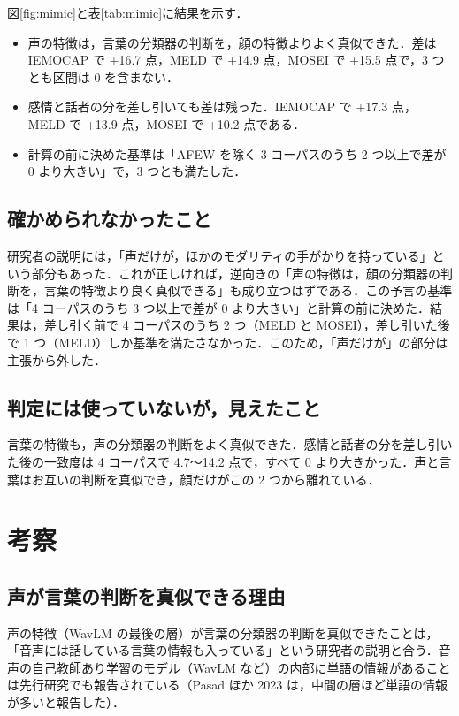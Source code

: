 \documentclass[a4paper,11pt]{ltjsarticle}
\begin{document}
図\ref{fig:mimic}と表\ref{tab:mimic}に結果を示す．
\begin{itemize}
  \item 声の特徴は，言葉の分類器の判断を，顔の特徴よりよく真似できた．差は IEMOCAP で +16.7 点，MELD で +14.9 点，MOSEI で +15.5 点で，3 つとも区間は 0 を含まない．
  \item 感情と話者の分を差し引いても差は残った．IEMOCAP で +17.3 点，MELD で +13.9 点，MOSEI で +10.2 点である．
  \item 計算の前に決めた基準は「AFEW を除く 3 コーパスのうち 2 つ以上で差が 0 より大きい」で，3 つとも満たした．
\end{itemize}

\subsection{確かめられなかったこと}

研究者の説明には，「声だけが，ほかのモダリティの手がかりを持っている」という部分もあった．これが正しければ，逆向きの「声の特徴は，顔の分類器の判断を，言葉の特徴より良く真似できる」も成り立つはずである．この予言の基準は「4 コーパスのうち 3 つ以上で差が 0 より大きい」と計算の前に決めた．結果は，差し引く前で 4 コーパスのうち 2 つ（MELD と MOSEI），差し引いた後で 1 つ（MELD）しか基準を満たさなかった．このため，「声だけが」の部分は主張から外した．

\subsection{判定には使っていないが，見えたこと}

言葉の特徴も，声の分類器の判断をよく真似できた．感情と話者の分を差し引いた後の一致度は 4 コーパスで 4.7〜14.2 点で，すべて 0 より大きかった．声と言葉はお互いの判断を真似でき，顔だけがこの 2 つから離れている．

\section{考察}

\subsection{声が言葉の判断を真似できる理由}

声の特徴（WavLM の最後の層）が言葉の分類器の判断を真似できたことは，「音声には話している言葉の情報も入っている」という研究者の説明と合う．音声の自己教師あり学習のモデル（WavLM など）の内部に単語の情報があることは先行研究でも報告されている（Pasad ほか 2023 は，中間の層ほど単語の情報が多いと報告した）．
\end{document}
